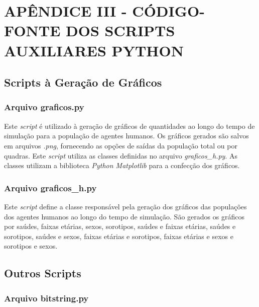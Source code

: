 \section{APÊNDICE III - CÓDIGO-FONTE DOS SCRIPTS AUXILIARES PYTHON}

\subsection{Scripts à Geração de Gráficos} 

\subsubsection{Arquivo graficos.py}

Este \textit{script} é utilizado à geração de gráficos de quantidades ao longo do tempo de simulação para a população de agentes humanos. Os gráficos gerados são salvos em arquivos \textit{.png}, fornecendo as opções de saídas da população total ou por quadras. Este \textit{script} utiliza as classes definidas no arquivo \textit{graficos\_h.py}. As classes utilizam a biblioteca \textit{Python Matplotlib} para a confecção dos gráficos.



\newpage

\subsubsection{Arquivo graficos\_h.py}

Este \textit{script} define a classe responsável pela geração dos gráficos das populações dos agentes humanos ao longo do tempo de simulação. São gerados os gráficos por saúdes, faixas etárias, sexos, sorotipos, saúdes e faixas etárias, saúdes e sorotipos, saúdes e sexos, faixas etárias e sorotipos, faixas etárias e sexos e sorotipos e sexos.



\newpage

\subsection{Outros Scripts} 

\subsubsection{Arquivo bitstring.py}


